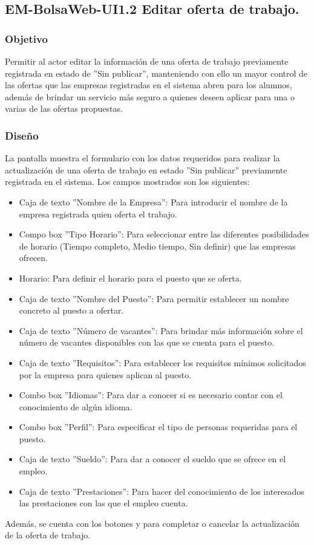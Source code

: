 

\subsection{EM-BolsaWeb-UI1.2 Editar oferta de trabajo.}

\subsubsection{Objetivo}
	\noindent
	Permitir al actor editar la información de una oferta de trabajo previamente registrada en estado de ''Sin publicar'', manteniendo con ello un mayor control de las ofertas que las empresas registradas en el sistema abren para los alumnos, además de brindar un servicio más seguro a quienes deseen aplicar para una o varias de las ofertas propuestas. 

\subsubsection{Diseño}
	\noindent
	La pantalla muestra el formulario con los datos requeridos para realizar la actualización de una oferta de trabajo en estado ''Sin publicar'' previamente registrada en el sistema.
	Los campos mostrados son los siguientes: 
	\begin{itemize}
		\item Caja de texto ''Nombre de la Empresa'': Para introducir el nombre de la empresa registrada quien oferta el trabajo.
		\item Compo box ''Tipo Horario'': Para seleccionar entre las diferentes posibilidades de horario (Tiempo completo, Medio tiempo, Sin definir) que las empresas ofrecen.
		\item Horario: Para definir el horario para el puesto que se oferta.
		\item Caja de texto ''Nombre del Puesto'': Para permitir establecer un nombre concreto al puesto a ofertar.
		\item Caja de texto ''Número de vacantes'': Para brindar más información sobre el número de vacantes disponibles con las que se cuenta para el puesto.
		\item Caja de texto ''Requisitos'': Para establecer los requisitos mínimos solicitados por la empresa para quienes aplican al puesto.
		\item Combo box ''Idiomas'': Para dar a conocer si es necesario contar con el conocimiento de algún idioma.
		\item Combo box ''Perfil'': Para especificar el tipo de personas requeridas para el puesto.
		\item Caja de texto ''Sueldo'': Para dar a conocer el sueldo que se ofrece en el empleo.
		\item Caja de texto ''Prestaciones'': Para hacer del conocimiento de los interesados las prestaciones con las que el empleo cuenta.
	\end{itemize}
	Además, se cuenta con los botones  y  para completar o cancelar la actualización de la oferta de trabajo.

